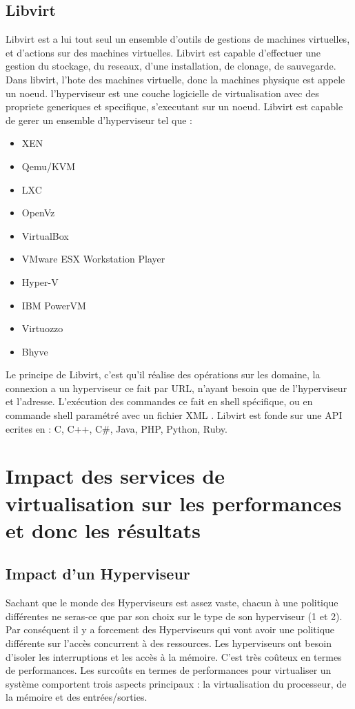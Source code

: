 \subsection{Libvirt}
Libvirt est a lui tout seul un ensemble d'outils de gestions de machines virtuelles, et d'actions sur des machines virtuelles. Libvirt est capable d'effectuer une gestion du stockage, du reseaux, d'une installation, de clonage, de sauvegarde. 
Dans libvirt, l'hote des machines virtuelle, donc la machines physique est appele un noeud. l'hyperviseur est une couche logicielle de virtualisation avec des propriete generiques et specifique, s'executant sur un noeud. Libvirt est capable de gerer un ensemble d'hyperviseur tel que : 
\begin{itemize}
\item XEN
\item Qemu/KVM
\item LXC
\item OpenVz
\item VirtualBox
\item VMware ESX Workstation Player
\item Hyper-V
\item IBM PowerVM
\item Virtuozzo
\item Bhyve
\end{itemize}
Le principe de Libvirt, c'est qu'il réalise des opérations sur les domaine, la connexion a un hyperviseur ce fait par URL, n'ayant besoin que de l'hyperviseur et l'adresse. L’exécution des commandes ce fait en shell spécifique, ou en commande shell paramétré avec un fichier XML . Libvirt est fonde sur une API ecrites en : C, C++, C\#, Java, PHP, Python, Ruby.
\newpage
\section{Impact des services de virtualisation sur les performances et donc les résultats}
\subsection{Impact d'un Hyperviseur}
Sachant que le monde des Hyperviseurs est assez vaste, chacun à une politique différentes ne seras-ce que par son choix sur le type de son hyperviseur (1 et 2). Par conséquent il y a forcement des Hyperviseurs qui vont avoir une politique différente sur l'accès concurrent à des ressources. Les hyperviseurs ont besoin d'isoler les interruptions et les accès à la mémoire. C'est très coûteux en termes de performances. Les surcoûts en termes de performances pour virtualiser un système comportent trois aspects principaux : la virtualisation du processeur, de la mémoire et des entrées/sorties.

